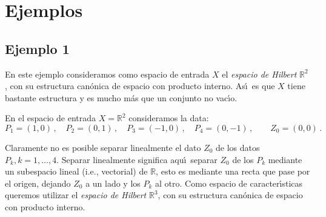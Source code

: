 \newpage
\section{Ejemplos}


\subsection{Ejemplo 1}
En este ejemplo consideramos como espacio de entrada $X$ el
{\em espacio de Hilbert\/} $\mathbb{R}^2$, con su estructura
can\'onica de espacio con producto interno.
As\'\i\ es que $X$ tiene bastante estructura y es mucho m\'as que
un conjunto no vac\'\i o.

\smallskip\noindent
En el espacio de entrada $X=\mathbb{R}^2$ consideramos la data:
$$
P_1=(1,0)\,,\quad
P_2=(0,1)\,,\quad
P_3=(-1,0)\,,\quad
P_4=(0,-1)\,,\qquad
Z_0=(0,0)\,.
$$

\begin{center}
\end{center}



Claramente no es posible separar linealmente el dato $Z_0$
de los datos $P_k, k=1, \ldots, 4$.
Separar linealmente significa aqu\'\i\ separar $Z_0$ de los $P_k$
mediante un subespacio lineal (i.e., vectorial) de $\mathbb{R}$,
esto es mediante una recta que pase por el origen, dejando $Z_0$
a un lado y los $P_k$ al otro.
\smallskip\noindent
Como espacio de caracter\'\i sticas queremos utilizar el
{\em espacio de Hilbert\/} $\mathbb{R}^3$, con su estructura
can\'onica de espacio con producto interno.

